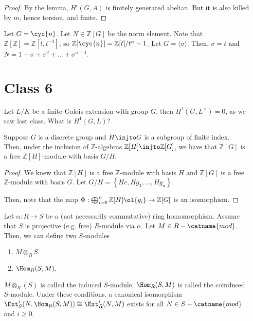 \documentclass[12pt]{scrartcl}
\begin{document}
\begin{proof}
By the lemma, $H^i(G, A)$ is finitely generated abelian.
But it is also killed by $m$, hence torsion, and finite.
\end{proof}
Let $G= \cyc{n}$.
Let $N \in \mathbb{Z}[G]$ be the norm element.
Note that $\mathbb{Z}[\mathbb{Z}] = \mathbb{Z}[t, t^{-1}]$, so $\mathbb{Z}[\cyc{n}] = \mathbb{Z}[t]/t^n-1$.
Let $G =\langle \sigma\rangle$.
Then, $\sigma = t$ and $N = 1 + \sigma + \sigma^2 + \dots + \sigma^{n-1}$.

\section{Class 6}

Let $L/K$ be a finite Galois extension with group $G$, then $H^1(G, L^{\times }) = 0$, as we saw last class.
What is $H^1(G, L)$?

\begin{lemma}
Suppose $G$ is a discrete group and $H \injto G$ is a subgroup of finite index. 
Then, under the inclusion of $\mathbb{Z}$-algebras $\mathbb{Z}[H] \injto \mathbb{Z}[G]$, we have that $\mathbb{Z}[G]$ is a free $\mathbb{Z}[H]$-module with basis $G/H$.
\end{lemma}
\begin{proof}
We knew that $\mathbb{Z}[H]$ is a free $\mathbb{Z}$-module with basis $H$ and $\mathbb{Z}[G]$ is a free $\mathbb{Z}$-module with basis $G$.
Let $G/H = \left\{He, Hg_1, \dots, Hg_n\right\}$.

Then, note that the map $\Phi: \bigoplus_{i=0}^n \mathbb{Z}[H] \ol{g_i} \to \mathbb{Z}[G]$ is an isomorphism.
\end{proof}
Let $\alpha: R \to S$ be a (not necessarily commutative) ring homomorphism.
Assume that $S$ is projective (e.g. free) $R$-module via $\alpha$.
	Let $M \in R-\catname{mod}$.
	Then, we can define two $S$-modules 
	\begin{enumerate}[label=\arabic*)]
		\item $M\otimes_R S$.
		\item $\Hom_R(S, M)$. 
	\end{enumerate}
\begin{proposition}
$M \otimes_R(S)$ is called the induced $S$-module.
$\Hom_R(S, M)$ is called the coinduced $S$-module. 
Under these conditions, a canonical isomorphism $\Ext_S^i(N, \Hom_R(S, M)) \cong \Ext_R^i(N, M)$ exists for all $N \in S-\catname{mod}$ and $i\geq 0$.   
\end{proposition}
\end{document}
